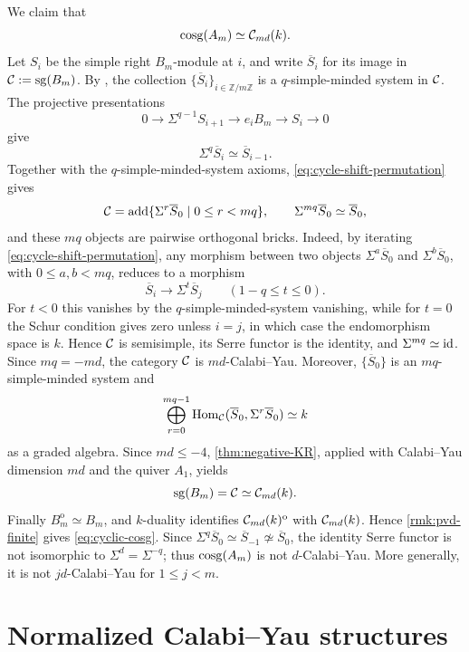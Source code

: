 \documentclass[11pt,a4paper,dvipsnames,x11names]{amsart}
\begin{document}
\begin{exa}
We claim that
\begin{equation}\label{eq:cyclic-cosg}
\operatorname{cosg}(A_m)\simeq\mathcal C_{md}(k).
\end{equation}
Let $S_i$ be the simple right $B_m$-module at $i$, and write $\overline S_i$ for its image in $\mathcal C:=\operatorname{sg}(B_m)$. By \cite[Theorems~2.4 and~5.6]{Jin20}, the collection $\{\overline S_i\}_{i\in\mathbb Z/m\mathbb Z}$ is a $q$-simple-minded system in $\mathcal C$. The projective presentations
\[
0\longrightarrow\Sigma^{q-1}S_{i+1}\longrightarrow e_iB_m\longrightarrow S_i\longrightarrow0
\]
give
\begin{equation}\label{eq:cycle-shift-permutation}
\Sigma^q\overline S_i\simeq\overline S_{i-1}.
\end{equation}
Together with the $q$-simple-minded-system axioms, \eqref{eq:cycle-shift-permutation} gives
\[
\mathcal C=\operatorname{add}\{\Sigma^r\overline S_0\mid0\leq r<mq\},
\qquad
\Sigma^{mq}\overline S_0\simeq\overline S_0,
\]
and these $mq$ objects are pairwise orthogonal bricks. Indeed, by iterating \eqref{eq:cycle-shift-permutation}, any morphism between two objects $\Sigma^a\overline S_0$ and $\Sigma^b\overline S_0$, with $0\leq a,b<mq$, reduces to a morphism
\[
\overline S_i\longrightarrow\Sigma^t\overline S_j
\qquad(1-q\leq t\leq0).
\]
For $t<0$ this vanishes by the $q$-simple-minded-system vanishing, while for $t=0$ the Schur condition gives zero unless $i=j$, in which case the endomorphism space is $k$. Hence $\mathcal C$ is semisimple, its Serre functor is the identity, and $\Sigma^{mq}\simeq\operatorname{id}$. Since $mq=-md$, the category $\mathcal C$ is $md$-Calabi--Yau. Moreover, $\{\overline S_0\}$ is an $mq$-simple-minded system and
\[
\bigoplus_{r=0}^{mq-1}\operatorname{Hom}_{\mathcal C}(\overline S_0,\Sigma^r\overline S_0)\simeq k
\]
as a graded algebra. Since $md\leq-4$, \cref{thm:negative-KR}, applied with Calabi--Yau dimension $md$ and the quiver $A_1$, yields
\[
\operatorname{sg}(B_m)=\mathcal C\simeq\mathcal C_{md}(k).
\]
Finally $B_m^{\mathrm{o}}\simeq B_m$, and $k$-duality identifies $\mathcal C_{md}(k)^{\mathrm{o}}$ with $\mathcal C_{md}(k)$. Hence \cref{rmk:pvd-finite} gives \eqref{eq:cyclic-cosg}. Since $\Sigma^q\overline S_0\simeq\overline S_{-1}\not\simeq\overline S_0$, the identity Serre functor is not isomorphic to $\Sigma^d=\Sigma^{-q}$; thus $\operatorname{cosg}(A_m)$ is not $d$-Calabi--Yau. More generally, it is not $jd$-Calabi--Yau for $1\leq j<m$.
\end{exa}

\section{Normalized Calabi--Yau structures}\label{sec:cy}
\end{document}
